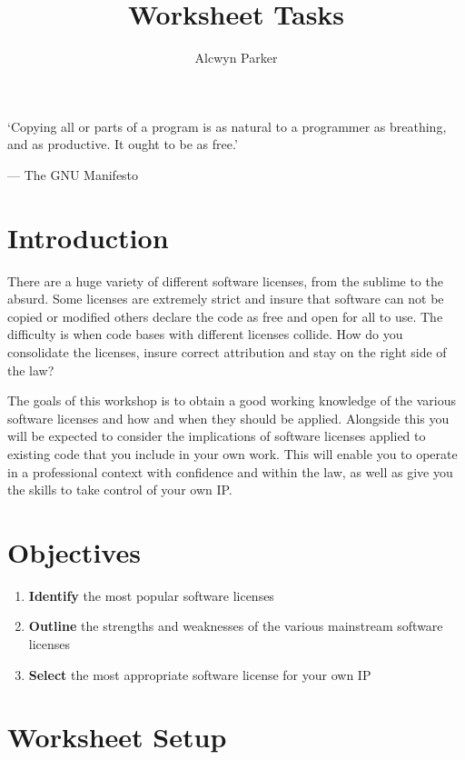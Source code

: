 \documentclass{../../../fal_assignment}
\title{Worksheet Tasks}
\author{Alcwyn Parker}
\begin{document}
\maketitle

\begin{marginquote}
`Copying all or parts of a program is as natural to a programmer as breathing, and as productive. It ought to be as free.'
\par --- The GNU Manifesto
\end{marginquote}

\section*{Introduction}

There are a huge variety of different software licenses, from the sublime to the absurd. Some licenses are extremely strict and insure that software can not be copied or modified others declare the code as free and open for all to use. The difficulty is when code bases with different licenses collide. How do you consolidate the licenses, insure correct attribution and stay on the right side of the law? 

The goals of this workshop is to obtain a good working knowledge of the various software licenses and how and when they should be applied. Alongside this you will be expected to consider the implications of software licenses applied to existing code that you include in your own work. This will enable you to operate in a professional context with confidence and within the law, as well as give you the skills to take control of your own IP.
 

\section*{Objectives}
\begin{enumerate}[label=(\Alph*)]
	\item \textbf{Identify} the most popular software licenses 
	\item \textbf{Outline} the strengths and weaknesses of the various mainstream software licenses
	\item \textbf{Select} the most appropriate software license for your own IP
\end{enumerate}

\section*{Worksheet Setup}
\end{document}
